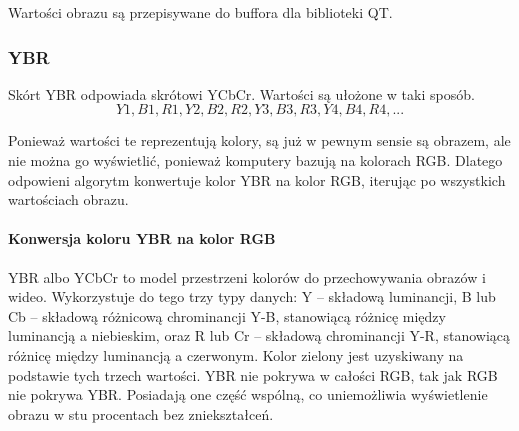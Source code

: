 Wartości obrazu są przepisywane do buffora dla biblioteki QT.

\subsubsection{YBR}

Skórt YBR odpowiada skrótowi YCbCr.
Wartości są ułożone w taki sposób.
\[Y1, B1, R1, Y2, B2, R2, Y3, B3, R3, Y4, B4, R4,  ...\]

Ponieważ wartości te reprezentują kolory, są już w pewnym sensie są obrazem, ale nie można go wyświetlić, ponieważ komputery bazują na kolorach RGB.
Dlatego odpowieni algorytm konwertuje kolor YBR na kolor RGB, iterując po wszystkich wartościach obrazu.

\paragraph{Konwersja koloru YBR na kolor RGB}

YBR albo YCbCr to model przestrzeni kolorów do przechowywania obrazów i wideo.
Wykorzystuje do tego trzy typy danych: Y – składową luminancji, B lub Cb – składową różnicową chrominancji Y-B, stanowiącą różnicę między luminancją a niebieskim, oraz R lub Cr – składową chrominancji Y-R, stanowiącą różnicę między luminancją a czerwonym.
Kolor zielony jest uzyskiwany na podstawie tych trzech wartości.
YBR nie pokrywa w całości RGB, tak jak RGB nie pokrywa YBR.
Posiadają one część wspólną, co uniemożliwia wyświetlenie obrazu w stu procentach bez zniekształceń.
